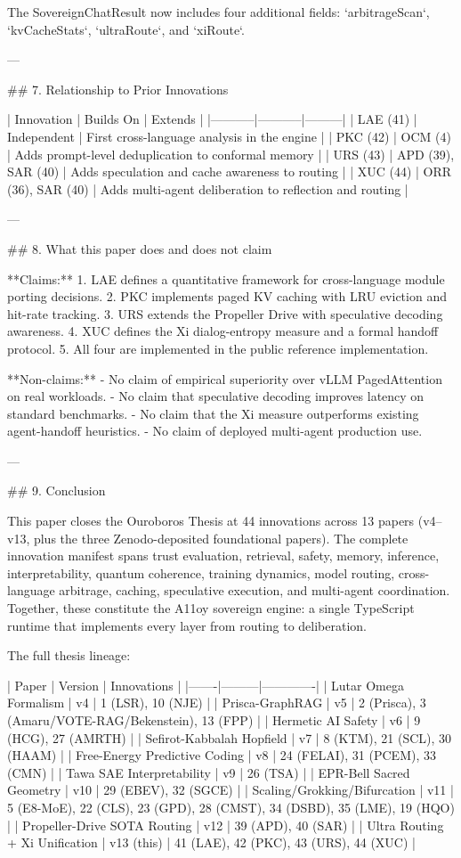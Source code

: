 The SovereignChatResult now includes four additional fields: `arbitrageScan`, `kvCacheStats`, `ultraRoute`, and `xiRoute`.

---

## 7. Relationship to Prior Innovations

| Innovation | Builds On | Extends |
|-----------|-----------|---------|
| LAE (41) | Independent | First cross-language analysis in the engine |
| PKC (42) | OCM (4) | Adds prompt-level deduplication to conformal memory |
| URS (43) | APD (39), SAR (40) | Adds speculation and cache awareness to routing |
| XUC (44) | ORR (36), SAR (40) | Adds multi-agent deliberation to reflection and routing |

---

## 8. What this paper does and does not claim

**Claims:**
1. LAE defines a quantitative framework for cross-language module porting decisions.
2. PKC implements paged KV caching with LRU eviction and hit-rate tracking.
3. URS extends the Propeller Drive with speculative decoding awareness.
4. XUC defines the Xi dialog-entropy measure and a formal handoff protocol.
5. All four are implemented in the public reference implementation.

**Non-claims:**
- No claim of empirical superiority over vLLM PagedAttention on real workloads.
- No claim that speculative decoding improves latency on standard benchmarks.
- No claim that the Xi measure outperforms existing agent-handoff heuristics.
- No claim of deployed multi-agent production use.

---

## 9. Conclusion

This paper closes the Ouroboros Thesis at 44 innovations across 13 papers (v4--v13, plus the three Zenodo-deposited foundational papers). The complete innovation manifest spans trust evaluation, retrieval, safety, memory, inference, interpretability, quantum coherence, training dynamics, model routing, cross-language arbitrage, caching, speculative execution, and multi-agent coordination. Together, these constitute the A11oy sovereign engine: a single TypeScript runtime that implements every layer from routing to deliberation.

The full thesis lineage:

| Paper | Version | Innovations |
|-------|---------|-------------|
| Lutar Omega Formalism | v4 | 1 (LSR), 10 (NJE) |
| Prisca-GraphRAG | v5 | 2 (Prisca), 3 (Amaru/VOTE-RAG/Bekenstein), 13 (FPP) |
| Hermetic AI Safety | v6 | 9 (HCG), 27 (AMRTH) |
| Sefirot-Kabbalah Hopfield | v7 | 8 (KTM), 21 (SCL), 30 (HAAM) |
| Free-Energy Predictive Coding | v8 | 24 (FELAI), 31 (PCEM), 33 (CMN) |
| Tawa SAE Interpretability | v9 | 26 (TSA) |
| EPR-Bell Sacred Geometry | v10 | 29 (EBEV), 32 (SGCE) |
| Scaling/Grokking/Bifurcation | v11 | 5 (E8-MoE), 22 (CLS), 23 (GPD), 28 (CMST), 34 (DSBD), 35 (LME), 19 (HQO) |
| Propeller-Drive SOTA Routing | v12 | 39 (APD), 40 (SAR) |
| Ultra Routing + Xi Unification | v13 (this) | 41 (LAE), 42 (PKC), 43 (URS), 44 (XUC) |

